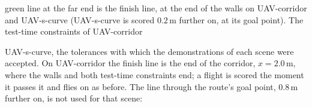 
  green line at the far end is the finish line, at the end of the walls on UAV-corridor and UAV-s-curve
  (UAV-s-curve is scored $0.2$\,m further on, at its goal point). The test-time constraints of UAV-corridor

UAV-s-curve, the tolerances with which the demonstrations of each scene were accepted. On UAV-corridor
    the finish line is the end of the corridor, $x=2.0$\,m, where the walls and both test-time constraints
    end; a flight is scored the moment it passes it and flies on as before. The line through the route's
    goal point, $0.8$\,m further on, is not used for that scene:

